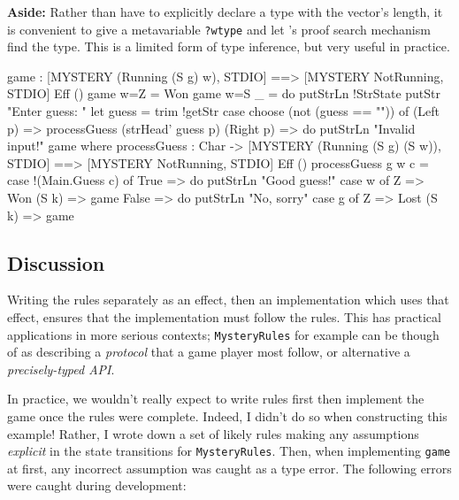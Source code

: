 \noindent
\textbf{Aside:} 
Rather than have to explicitly declare a type with the vector's length, it
is convenient to give a metavariable \texttt{?wtype} and let \Idris{}'s
proof search mechanism find the type. This is a limited form of type
inference, but very useful in practice.

\begin{code}[float=h,frame=single,caption={Mystery Word Game Implementation},label=mword]
game : { [MYSTERY (Running (S g) w), STDIO] ==>
         [MYSTERY NotRunning, STDIO] } Eff ()
game {w=Z} = Won
game {w=S _}
     = do putStrLn !StrState
          putStr "Enter guess: "
          let guess = trim !getStr
          case choose (not (guess == "")) of
               (Left p) => processGuess (strHead' guess p)
               (Right p) => do putStrLn "Invalid input!"
                               game
  where
    processGuess : Char -> { [MYSTERY (Running (S g) (S w)), STDIO] ==>
                             [MYSTERY NotRunning, STDIO] }
                           Eff ()
    processGuess {g} {w} c
      = case !(Main.Guess c) of
             True => do putStrLn "Good guess!"
                        case w of
                             Z => Won
                             (S k) => game
             False => do putStrLn "No, sorry"
                         case g of
                              Z => Lost
                              (S k) => game
\end{code}

\subsection{Discussion}

Writing the rules separately as an effect, then an implementation which uses
that effect, ensures that the implementation must follow the rules. This has
practical applications in more serious contexts; \texttt{MysteryRules} for
example can be though of as describing a \emph{protocol} that a game
player most follow, or alternative a \emph{precisely-typed API}.

In practice, we wouldn't really expect to write rules first then implement
the game once the rules were complete. Indeed, I didn't do so when constructing
this example! Rather, I wrote down a set of likely rules making 
any assumptions \emph{explicit} in the state transitions for \texttt{MysteryRules}. 
Then, when implementing \texttt{game} at
first, any incorrect assumption was caught as a type error. The following
errors were caught during development:

